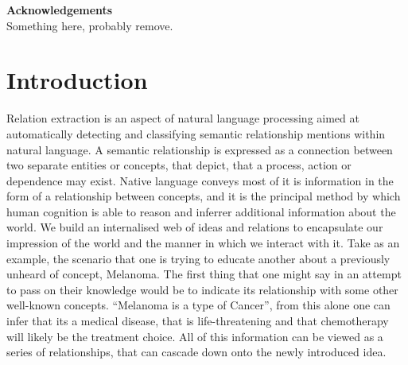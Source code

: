 \documentclass[11pt]{article} %
\begin{document}
\pagestyle{empty}
\tableofcontents %
\newpage %

\vspace{5cm}

\begin{center}
\begin{minipage}{0.8\textwidth}
\centering
\textbf{Acknowledgements}\\[1cm]

Something here, probably remove.

\end{minipage}
\end{center}

\newpage

\pagestyle{plain}
\setcounter{page}{1}


\section{Introduction}

Relation extraction is an aspect of natural language processing aimed at automatically detecting and classifying semantic relationship mentions within natural language. A semantic relationship is expressed as a connection between two separate entities or concepts, that depict, that a process, action or dependence may exist. Native language conveys most of it is information in the form of a  relationship between concepts, and it is the principal method by which human cognition is able to reason and inferrer additional information about the world. We build an internalised web of ideas and relations to encapsulate our impression of the world and the manner in which we interact with it. Take as an example, the scenario that one is trying to educate another about a previously unheard of concept, Melanoma. The first thing that one might say in an attempt to pass on their knowledge would be to indicate its relationship with some other well-known concepts. “Melanoma is a type of Cancer”, from this alone one can infer that its a medical disease, that is life-threatening and that chemotherapy will likely be the treatment choice. All of this information can be viewed as a series of relationships, that can cascade down onto the newly introduced idea.
\end{document}
